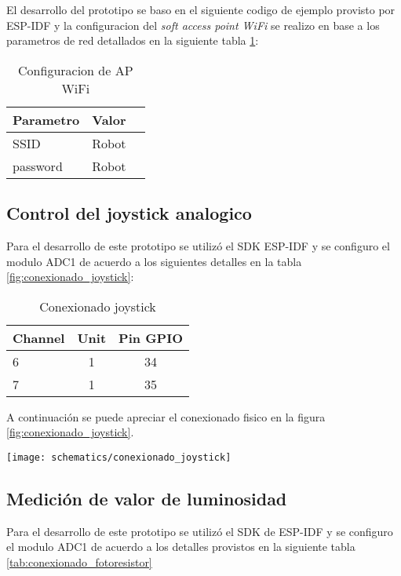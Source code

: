 El desarrollo del prototipo se baso en el siguiente codigo de ejemplo \cite{ESP32_WiFi_Example} provisto por ESP-IDF y la configuracion del \textit{soft access point WiFi} se realizo en base a los parametros de red detallados en la siguiente tabla  \ref{tab:configuracion_wifi}: 

\vspace{0.5cm}
\begin{table}[h]
\centering
\caption[Configuracion de AP WiFi]{Configuracion de AP WiFi}
\begin{tabular}{l c c}
\toprule
\textbf{Parametro} & \textbf{Valor} \\
\midrule
SSID & Robot  \\
password & Robot  \\
\bottomrule
\hline
\end{tabular}
\label{tab:configuracion_wifi}
\end{table}



\subsection{Control del joystick analogico}
Para el desarrollo de este prototipo se utilizó el SDK ESP-IDF y se configuro el modulo ADC1 de acuerdo a los siguientes detalles en la tabla \ref{fig:conexionado_joystick}:

\vspace{0.5cm}
\begin{table}[h]
\centering
\caption[Conexionado joystick]{Conexionado joystick}
\begin{tabular}{l c c}
\toprule
\textbf{Channel} & \textbf{Unit} & \textbf{Pin GPIO}\\
\midrule
6 & 1 & 34 \\
7 & 1 & 35 \\
\bottomrule
\hline
\end{tabular}
\label{tab:conexionado_joystick}
\end{table}

A continuación se puede apreciar el conexionado fisico en la figura \ref{fig:conexionado_joystick}.

\begin{center}
  \texttt{[image: schematics/conexionado\_joystick]}
    \label{fig:conexionado_joystick}
\end{center}



\subsection{Medición de valor de luminosidad}
Para el desarrollo de este prototipo se utilizó el SDK de ESP-IDF y se configuro el modulo ADC1 de acuerdo a los detalles provistos en la siguiente tabla \ref{tab:conexionado_fotoresistor} 

